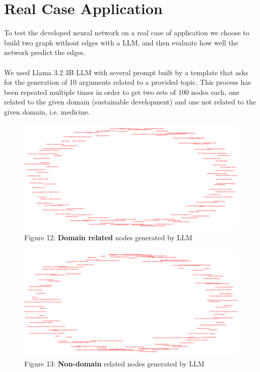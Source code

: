 \documentclass[11pt]{article}
\begin{document}
	\section{Real Case Application}
	To test the developed neural network on a real case of application we choose to build two graph without edges with a LLM, and then evaluate how well the network predict the edges.\\\\
	We used Llama 3.2 3B LLM \cite{grattafiori2024llama3herdmodels} with several prompt built by a template that asks for the generation of 10 arguments related to a provided topic. This process has been repeated multiple times in order to get two sets of 100 nodes each, one related to the given domain (sustainable development) and one not related to the given domain, i.e. medicine. 
	
	\begin{figure}[h!]
		\centering
		\includegraphics[width=1\textwidth]{images/domain_graph_no_edges.png}
		\caption{Figure 12: \textbf{Domain related} nodes generated by LLM}
		\label{figure_12}
	\end{figure}
	
	\begin{figure}[h!]
		\centering
		\includegraphics[width=1\textwidth]{images/non_domain_graph_no_edges.png}
		\caption{Figure 13: \textbf{Non-domain} related nodes generated by LLM}
		\label{figure_13}
	\end{figure}
	
\end{document}
